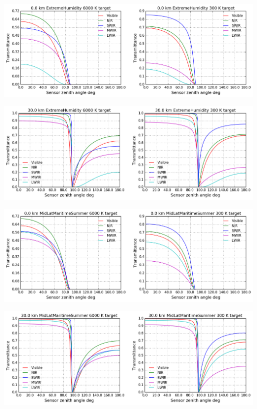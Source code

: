 \documentclass{workpackage}
\begin{document}
\begin{center}
\includegraphics{./pic/Analyse-Standard-Atmospheres_43_2.png}
\end{center}

\begin{center}
\includegraphics{./pic/Analyse-Standard-Atmospheres_43_3.png}
\end{center}

\begin{center}
\includegraphics{./pic/Analyse-Standard-Atmospheres_43_4.png}
\end{center}

\begin{center}
\includegraphics{./pic/Analyse-Standard-Atmospheres_43_5.png}
\end{center}
\end{document}
